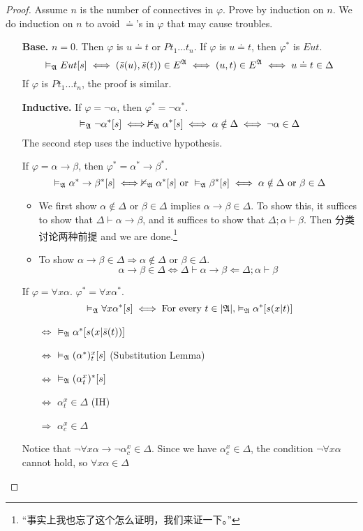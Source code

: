 \begin{proof}
    Assume $n$ is the number of connectives in $\varphi$. Prove by induction on $n$. We do induction on $n$ to avoid $\doteq$'s in $\varphi$ that may cause troubles.
    \begin{itemize}
        \item[] \textbf{Base.} $n=0$. Then $\varphi$ is $u\doteq t$ or $Pt_1\dots t_n$. If $\varphi$ is $u\doteq t$, then $\varphi^*$ is $Eut$.
        \[ \vDash_{\mathfrak{A}}Eut[s] \iff (\bar{s}(u), \bar{s}(t)) \in E^{\mathfrak{A}} \iff (u,t) \in E^{\mathfrak{A}} \iff u\doteq t \in \Delta \]
        If $\varphi$ is $Pt_1\dots t_n$, the proof is similar.

        \item[] \textbf{Inductive.} If $\varphi = \neg\alpha$, then $\varphi^*=\neg\alpha^*$.
        \[ \vDash_{\mathfrak{A}}\neg\alpha^*[s] \iff \nvDash_{\mathfrak{A}}\alpha^*[s] \iff \alpha\notin\Delta\iff\neg\alpha\in\Delta \]
        The second step uses the inductive hypothesis.

        If $\varphi=\alpha\to\beta$, then $\varphi^*=\alpha^*\to\beta^*$.
        \[ \vDash_{\mathfrak{A}}\alpha^*\to\beta^*[s] \iff \nvDash_{\mathfrak{A}}\alpha^*[s]\text{ or }\vDash_{\mathfrak{A}}\beta^*[s] \iff \alpha\notin\Delta \text{ or }\beta\in\Delta \]
        \begin{itemize}
            \item We first show $\alpha\notin\Delta$ or $\beta\in\Delta$ implies $\alpha\to\beta\in\Delta$. To show this, it suffices to show that $\Delta\vdash\alpha\to\beta$, and it suffices to show that $\Delta;\alpha\vdash\beta$. Then 分类讨论两种前提 and we are done.\footnote{“事实上我也忘了这个怎么证明，我们来证一下。”}
            \item To show $\alpha\to\beta\in\Delta\Rightarrow\alpha\notin\Delta$ or $\beta\in\Delta$.
            \[ \alpha\to\beta\in\Delta\iff\Delta\vdash\alpha\to\beta\Longleftarrow\Delta;\alpha\vdash\beta \]
        \end{itemize}

        If $\varphi=\forall{x}\alpha$. $\varphi^*=\forall{x}\alpha^*$.
        \[ \vDash_{\mathfrak{A}}\forall{x}\alpha^*[s] \iff \text{For every $t\in|\mathfrak{A}|$,} \vDash_{\mathfrak{A}}\alpha^*[s(x|t)] \]
        \begin{itemize}
            \item[$\iff$] $\vDash_{\mathfrak{A}}\alpha^*[s(x|\bar{s}(t))]$
            \item[$\iff$] $\vDash_{\mathfrak{A}}(\alpha^*)^x_t[s]$ (Substitution Lemma)
            \item[$\iff$] $\vDash_{\mathfrak{A}}(\alpha^x_t)^*[s]$
            \item[$\iff$] $\alpha_t^x \in \Delta$ (IH) 
            \item[$\Longrightarrow$] $\alpha_c^x\in\Delta$ 
        \end{itemize}
        Notice that $\neg\forall{x}\alpha\to\neg\alpha_c^x \in \Delta$. Since we have $\alpha_c^x\in\Delta$, the condition $\neg\forall{x}\alpha$ cannot hold, so $\forall{x}\alpha\in\Delta$


\end{itemize}
\end{proof}
